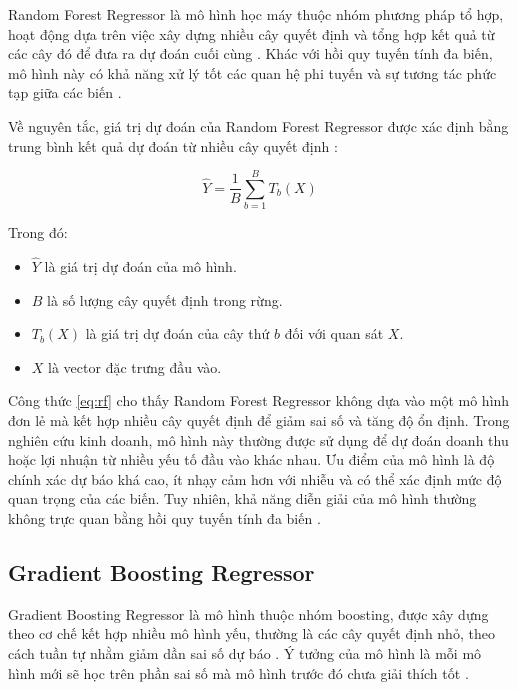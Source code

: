 Random Forest Regressor là mô hình học máy thuộc nhóm phương pháp tổ hợp, hoạt động dựa trên việc xây dựng nhiều cây quyết định và tổng hợp kết quả từ các cây đó để đưa ra dự đoán cuối cùng \cite{sklearn_rf,esl}. Khác với hồi quy tuyến tính đa biến, mô hình này có khả năng xử lý tốt các quan hệ phi tuyến và sự tương tác phức tạp giữa các biến \cite{sklearn_rf}.

Về nguyên tắc, giá trị dự đoán của Random Forest Regressor được xác định bằng trung bình kết quả dự đoán từ nhiều cây quyết định \cite{sklearn_rf}:

\begin{equation}
\hat{Y} = \frac{1}{B} \sum_{b=1}^{B} T_b(X)
\label{eq:rf}
\end{equation}

Trong đó:
\begin{itemize}
    \item \(\hat{Y}\) là giá trị dự đoán của mô hình.
    \item \(B\) là số lượng cây quyết định trong rừng.
    \item \(T_b(X)\) là giá trị dự đoán của cây thứ \(b\) đối với quan sát \(X\).
    \item \(X\) là vector đặc trưng đầu vào.
\end{itemize}

Công thức \eqref{eq:rf} cho thấy Random Forest Regressor không dựa vào một mô hình đơn lẻ mà kết hợp nhiều cây quyết định để giảm sai số và tăng độ ổn định. Trong nghiên cứu kinh doanh, mô hình này thường được sử dụng để dự đoán doanh thu hoặc lợi nhuận từ nhiều yếu tố đầu vào khác nhau. Ưu điểm của mô hình là độ chính xác dự báo khá cao, ít nhạy cảm hơn với nhiễu và có thể xác định mức độ quan trọng của các biến. Tuy nhiên, khả năng diễn giải của mô hình thường không trực quan bằng hồi quy tuyến tính đa biến \cite{sklearn_rf,esl}.

\subsection*{\thesubsection\quad Gradient Boosting Regressor}

Gradient Boosting Regressor là mô hình thuộc nhóm boosting, được xây dựng theo cơ chế kết hợp nhiều mô hình yếu, thường là các cây quyết định nhỏ, theo cách tuần tự nhằm giảm dần sai số dự báo \cite{sklearn_gbr,esl}. Ý tưởng của mô hình là mỗi mô hình mới sẽ học trên phần sai số mà mô hình trước đó chưa giải thích tốt \cite{sklearn_gbr}.

